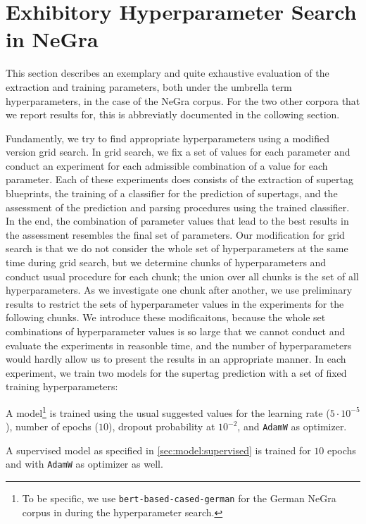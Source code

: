 \documentclass[../../document.tex]{subfiles}
\begin{document}
    \section{Exhibitory Hyperparameter Search in NeGra}\label{sec:gridsearch}
    This section describes an exemplary and quite exhaustive evaluation of the extraction and training parameters, both under the umbrella term hyperparameters, in the case of the NeGra corpus.
    For the two other corpora that we report results for, this is abbreviatly documented in the collowing section.
    
    Fundamently, we try to find appropriate hyperparameters using a modified version grid search.
    In grid search, we fix a set of values for each parameter and conduct an experiment for each admissible combination of a value for each parameter.
    Each of these experiments does consists of the extraction of supertag blueprints, the training of a classifier for the prediction of supertags, and the assessment of the prediction and parsing procedures using the trained classifier.
    In the end, the combination of parameter values that lead to the best results in the assessment resembles the final set of parameters.
    Our modification for grid search is that we do not consider the whole set of hyperparameters at the same time during grid search, but we determine chunks of hyperparameters and conduct usual procedure for each chunk; the union over all chunks is the set of all hyperparameters.
    As we investigate one chunk after another, we use preliminary results to restrict the sets of hyperparameter values in the experiments for the following chunks.
    We introduce these modificaitons, because the whole set combinations of hyperparameter values is so large that we cannot conduct and evaluate the experiments in reasonble time, and the number of hyperparameters would hardly allow us to present the results in an appropriate manner.
    In each experiment, we train two models for the supertag prediction with a set of fixed training hyperparameters:
    \begin{compactitem}
        \item A  model\footnote{
            To be specific, we use \texttt{bert-based-cased-german} for the German NeGra corpus in during the hyperparameter search.
        } is trained using the usual suggested values for the learning rate ($5\cdot 10^{-5}$), number of epochs ($10$), dropout probability at \(10^{-2}\), and \texttt{AdamW} as optimizer.
        \item A supervised model as specified in \cref{sec:model:supervised} is trained for $10$ epochs and with \texttt{AdamW} as optimizer as well.
    \end{compactitem}
\end{document}
